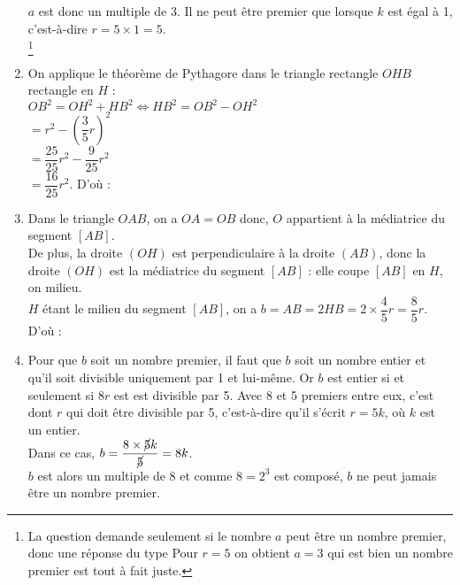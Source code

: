 \begin{enumerate}
   $a$ est donc un multiple de $3$. Il ne peut être premier que lorsque $k$ est égal à 1, c'est-à-dire $r = 5\times1 =5$. \\
    \footnote{La question demande seulement si le nombre $a$ peut être un nombre premier, donc une réponse du type \og Pour $r =5$ on obtient $a =3$ qui est bien un nombre premier \fg{} est tout à fait juste.}
   \item On applique le théorème de Pythagore dans le triangle rectangle $OHB$ rectangle en $H$ : \\
   $OB^2 = OH^2+ HB^2 \iff HB^2 = OB^2-OH^2$ \\
   \hspace*{4.4cm} $=r^2-\left(\dfrac35r\right)^2$ \\ [1mm]
   \hspace*{4.4cm} $= \dfrac{25}{25}r^2-\dfrac{9}{25}r^2$ \\ [1mm]
   \hspace*{4.4cm} $= \dfrac{16}{25} r^2$. \qquad D'où : 
   \smallskip
   \item Dans le triangle $OAB$, on a $OA = OB$ donc, $O$ appartient à la médiatrice du segment $[AB]$. \\
   De plus, la droite $(OH)$ est perpendiculaire à la droite $(AB)$, donc la droite $(OH)$ est la médiatrice du segment $[AB]$ : elle coupe $[AB]$ en $H$, on milieu. \\
   $H$ étant le milieu du segment $[AB]$, on a $b =AB = 2HB =2\times\dfrac45r =\dfrac{8}{5}r$. \\
   D'où : 
   \smallskip
   \item Pour que $b$ soit un nombre premier, il faut que $b$ soit un nombre entier et qu'il soit divisible uniquement par 1 et lui-même. Or $b$ est entier si et seulement si $8r$ est est divisible par 5. Avec 8 et 5 premiers entre eux, c'est dont $r$ qui doit être divisible par 5, c'est-à-dire qu'il s'écrit $r = 5k$, où $k$ est un entier. \\
   Dans ce cas, $b =\dfrac{8\times\cancel{5}k}{\cancel{5}} =8k$. \\
   $b$ est alors un multiple de 8 et comme $8 =2^3$ est composé, $b$ ne peut jamais être un nombre premier. \\
\end{enumerate}
